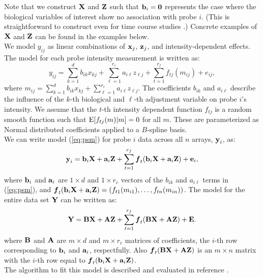\documentclass[11pt]{article}
\newcommand{ \bm }[1]{ \mbox{\bf {#1}} }
\newcommand{ \bmm }[1]{ \mbox{\boldmath ${#1}$} }
\newcommand{\e}{{\rm E}}
\newcommand{\bX}{\bm{X}}
\newcommand{\bZ}{\bm{Z}}
\newcommand{\bE}{\bm{E}}
\newcommand{\bA}{\bm{A}}
\newcommand{\bB}{\bm{B}}
\newcommand{\bei}{\bm{e}_i}
\newcommand{\bai}{\bm{a}_i}
\newcommand{\bbi}{\bm{b}_i}
\begin{document}
Note that we construct $\bm{X}$ and $\bm{Z}$ such that $\bm{b}_i=\bm{0}$ represents the case where 
the biological variables of interest show no association with probe $i$.  (This is straightforward 
to construct even for time course studies \cite{Storey05a}.)  Concrete examples of $\bm{X}$ and 
$\bm{Z}$ can be found in the examples below.\\

We model $y_{ij}$ as linear combinations of $\bm{x}_j$, $\bm{z}_j$, and intensity-dependent effects.  
The model for each probe intensity measurement is written as:
\begin{equation}\label{eq:psm}
y_{ij} = \sum_{k=1}^d b_{ik} x_{kj} + \sum_{\ell=1}^{r_c} a_{i\ell} z_{\ell j} + \sum_{t=1}^{r_f} f_{tj}\left(m_{ij}\right) + e_{ij},
\end{equation}
where $m_{ij} = \sum_{k=1}^d b_{ik} x_{kj} + \sum_{\ell=1}^{r_c} a_{i\ell} z_{\ell j}$.  The coefficients 
$b_{ik}$ and $a_{i\ell}$ describe the influence of the $k$-th biological and $\ell$-th adjustment 
variable on probe $i$'s intensity.  We assume that the $t$-th intensity dependent function $f_{tj}$ is 
a random smooth function such that $\e[f_{tj}(m) | m] = 0$ for all $m$.  These are parameterized as 
Normal distributed coefficients applied to a $B$-spline basis. \\

We can write model (\ref{eq:psm}) for probe $i$ data across all $n$ arrays, $\bm{y}_i$, as:
\begin{equation} \label{eq:mpsm}
  \bm{y}_i = \bbi \bm{X}+\bai \bm{Z} + \sum_{t=1}^{r_f} \bmm{f}_{t}(\bbi\bX + \bai\bZ) + \bei, 
\end{equation}
where $\bbi$ and $\bai$ are $1 \times d$ and $1 \times r_c$ vectors of the $b_{ik}$ and $a_{i \ell}$ 
terms in (\ref{eq:psm}), and $\bmm{f}_t (\bbi\bX + \bai\bZ)= \left(f_{t1}(m_{i1}), \ldots, f_{tn}(m_{in})\right)$. 
The model for the entire data set $\bm{Y}$ can be written as:
\begin{equation}\label{eq:ssm}
  \bm{Y} = \bB \bm{X}+\bA \bm{Z} + \sum_{t=1}^{r_f} \bmm{f}_{t}(\bB\bX + \bA\bZ) + \bE.
\end{equation}
where $\bB$ and $\bA$ are $m \times d$ and $m \times r_c$ matrices of coefficients, the $i$-th row 
corresponding to $\bbi$ and $\bai$, respectfully.  Also $\bmm{f}_{t}(\bB\bX + \bA\bZ)$ is an $m \times n$ 
matrix with the $i$-th row equal to $\bmm{f}_t (\bbi\bX + \bai\bZ)$.\\

The algorithm to fit this model is described and evaluated in
reference \cite{mecham2010}.
\end{document}
